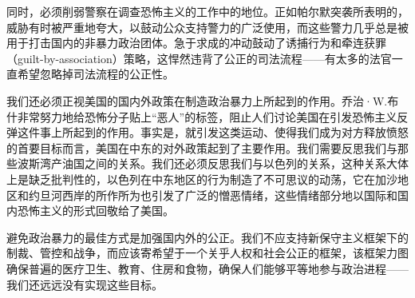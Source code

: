 \documentclass[fontset=fandol, a4paper, 12pt, openright]{ctexbook}
\begin{document}
同时，必须削弱警察在调查恐怖主义的工作中的地位。正如帕尔默突袭所表明的，威胁有时被严重地夸大，以鼓动公众支持警力的广泛使用，而这些警力几乎总是被用于打击国内的非暴力政治团体。急于求成的冲动鼓动了诱捕行为和牵连获罪（guilt-by-association）策略，这悍然违背了公正的司法流程——有太多的法官一直希望忽略掉司法流程的公正性。

我们还必须正视美国的国内外政策在制造政治暴力上所起到的作用。乔治·W.布什非常努力地给恐怖分子贴上“恶人”的标签，阻止人们讨论美国在引发恐怖主义反弹这件事上所起到的作用。事实是，就引发这类运动、使得我们成为对方释放愤怒的首要目标而言，美国在中东的对外政策起到了主要作用。我们需要反思我们与那些波斯湾产油国之间的关系。我们还必须反思我们与以色列的关系，这种关系大体上是缺乏批判性的，以色列在中东地区的行为制造了不可思议的动荡，它在加沙地区和约旦河西岸的所作所为也引发了广泛的憎恶情绪，这些情绪部分地以国际和国内恐怖主义的形式回敬给了美国。

避免政治暴力的最佳方式是加强国内外的公正。我们不应支持新保守主义框架下的制裁、管控和战争，而应该寄希望于一个关乎人权和社会公正的框架，该框架力图确保普遍的医疗卫生、教育、住房和食物，确保人们能够平等地参与政治进程——我们还远远没有实现这些目标。
\end{document}
